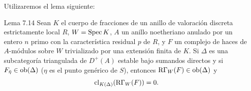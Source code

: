 Utilizaremos el lema siguiente:

\begin{statement}{Lema 7.14}
Sean $K$ el cuerpo de fracciones de un anillo de valoración discreta estrictamente local $R$, $W=\operatorname{Spec} K$, $A$ un anillo noetheriano anulado por un entero $n$ primo con la característica residual $p$ de $R$, y $F$ un complejo de haces de $A$-módulos sobre $W$ trivializado por una extensión finita de $K$. Si $\Delta$ es una subcategoría triangulada de $D^+(A)$ estable bajo sumandos directos y si $F_{\bar\eta}\in\operatorname{ob}(\Delta)$ ($\eta$ es el punto genérico de $S$), entonces $\mathrm R\Gamma_W(F)\in\operatorname{ob}(\Delta)$ y
\[
\operatorname{cl}_{K(\Delta)}(\mathrm R\Gamma_W(F))=0.
\]
\end{statement}
